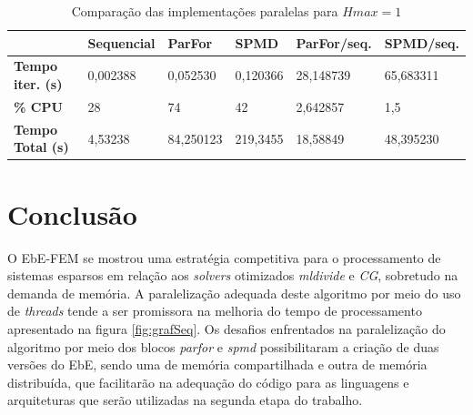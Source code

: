 \documentclass[
    12pt,               %
    openright,          %
    oneside,
    a4paper,            %
    english,            %
    french,             %
    spanish,            %
    brazil              %
    ]{abntex2}
\begin{document}
\begin{table}[]
	\centering
	\begin{tabular}{|l|l|l|l|l|l|}
		\hline
		\textbf{}                & \textbf{Sequencial} & \textbf{ParFor} & \textbf{SPMD} & \textbf{ParFor/seq.} & \textbf{SPMD/seq.} \\ \hline
		\textbf{Tempo iter. (s)} & 0,002388        & 0,052530    & 0,120366  & 28,148739        & 65,683311      \\ \hline
		\textbf{\% CPU}          & 28                  & 74              & 42            & 2,642857         & 1,5                \\ \hline
		\textbf{Tempo Total (s)} & 4,53238             & 84,250123       & 219,3455    & 18,58849         & 48,395230      \\ \hline
	\end{tabular}
	\caption{Comparação das implementações paralelas para $Hmax = 1$}
		\label{tab:comPar}
\end{table}



\chapter{Conclusão}
O EbE-FEM se mostrou uma estratégia competitiva para o processamento de sistemas esparsos em relação aos \textit{solvers} otimizados \textit{mldivide} e \textit{CG}, sobretudo na demanda de memória. A paralelização adequada deste algoritmo por meio do uso de \textit{threads} tende a ser promissora na melhoria do tempo de processamento apresentado na figura \ref{fig:grafSeq}. Os desafios enfrentados na paralelização do algoritmo por meio dos blocos \textit{parfor} e \textit{spmd} possibilitaram a criação de duas versões do EbE, sendo uma de memória compartilhada e outra de memória distribuída, que facilitarão na adequação do código para as linguagens e arquiteturas que serão utilizadas na segunda etapa do trabalho.
\postextual


%

\end{document}
